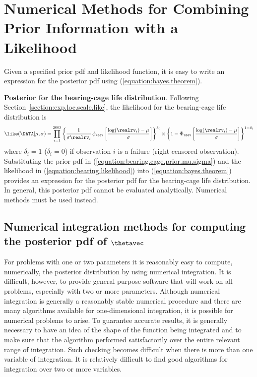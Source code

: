 \section{Numerical Methods for Combining Prior 
	Information with a Likelihood}
\label{section:numerical bayes}

Given a specified prior pdf and likelihood function,
it is easy to write an expression for the posterior pdf
using (\ref{equation:bayes.theorem}).

\begin{example}
\label{example:bearing.cage.posterior.form}
{\bf Posterior for the bearing-cage life distribution}. 
Following Section~\ref{section:exp.loc.scale.like},
the likelihood for the bearing-cage life distribution is 
\begin{equation}
\label{equation:bearing.likelihood}
\like(\DATA | \mu,\sigma) = \prod_{i=1}^{2003}
\left\{ \frac{1}{\sigma \realrv_{i}} \, \phi_{\sev}
\left[\frac{ \log(\realrv_{i}) -\mu}{\sigma}
\right]
\right\}^{\delta_{i}}
\times
 \left\{1-\Phi_{\sev} \left[\frac{ \log(\realrv_{i}) -\mu}{\sigma}
\right] \right\}^{1-\delta_{i}} 
\end{equation}
where $\delta_{i}=1$ ($\delta_{i}=0$) if observation $i$ is a
failure (right censored observation).  Substituting the prior pdf in
(\ref{equation:bearing.cage.prior.mu.sigma}) and the likelihood in
(\ref{equation:bearing.likelihood}) into
(\ref{equation:bayes.theorem}) provides an expression for the
posterior pdf for the bearing-cage life distribution.  In
general, this posterior pdf cannot be evaluated
analytically. Numerical methods must be used instead.
\end{example}

\subsection{Numerical integration methods for 
	computing the posterior pdf of $ \protect \boldsymbol{\thetavec}$} 

For problems with one or two parameters it is reasonably easy to
compute, numerically, the posterior distribution by using numerical
integration.  It is difficult, however, to provide general-purpose
software that will work on all problems, especially with two or more
parameters.  Although numerical integration is generally a reasonably
stable numerical procedure and there are many algorithms available
for one-dimensional integration, it is possible for numerical problems
to arise. To guarantee accurate results, it is generally necessary to
have an idea of the shape of the function being integrated and to make
sure that the algorithm performed satisfactorily over the entire
relevant range of integration. Such checking becomes difficult when
there is more than one variable of integration. It is relatively
difficult to find good algorithms for integration over two or more
variables.

